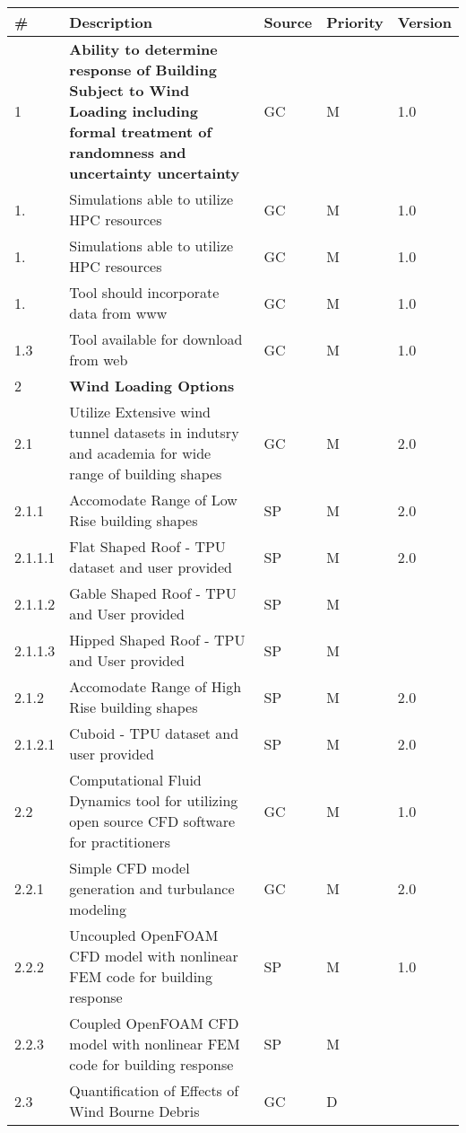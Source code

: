 \begin{longtable}{| p{} | p{} | p{} | p{} |  p{} |}
                               \toprule
       \# & Description & Source & Priority & Version \\ \hline
1 & \textbf{Ability to determine response of Building Subject to Wind Loading including formal treatment of randomness and uncertainty uncertainty} & GC & M & 1.0  \\ \hline
1. & Simulations able to utilize HPC resources & GC & M & 1.0 \\ \hline
1. & Simulations able to utilize HPC resources & GC & M & 1.0 \\ \hline
 1. & Tool should incorporate data from www & GC & M & 1.0 \\ \hline
 1.3 & Tool available for download from web & GC & M & 1.0 \\ \hline
          2 & \textbf{Wind Loading Options } &  &  \\ \hline
2.1 & Utilize Extensive wind tunnel datasets in indutsry and academia for wide range of building shapes & GC & M & 2.0 \\ \hline
2.1.1 & Accomodate Range of Low Rise building shapes & SP & M & 2.0 \\ \hline
2.1.1.1 & Flat Shaped Roof - TPU dataset and user provided & SP & M & 2.0 \\ \hline
2.1.1.2 & Gable Shaped Roof - TPU and User provided & SP & M & \\ \hline
2.1.1.3 & Hipped Shaped Roof - TPU and User provided & SP & M & \\ \hline
2.1.2 & Accomodate Range of High Rise building shapes & SP & M & 2.0 \\ \hline
2.1.2.1 & Cuboid  - TPU dataset and user provided & SP & M & 2.0 \\ \hline
2.2 & Computational Fluid Dynamics tool for utilizing open source CFD software for practitioners & GC & M & 1.0 \\ \hline
2.2.1 & Simple CFD model generation and turbulance modeling & GC & M & 2.0 \\ \hline
2.2.2 & Uncoupled OpenFOAM CFD model with nonlinear FEM code for building response & SP & M & 1.0 \\ \hline
2.2.3 & Coupled OpenFOAM CFD model with nonlinear FEM code for building response & SP & M &  \\ \hline
2.3 & Quantification of Effects of Wind Bourne Debris & GC & D & \\ \hline

\end{longtable}
